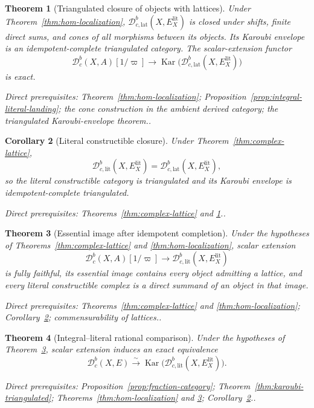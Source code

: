 \documentclass[10pt]{article}
\newtheorem{theorem}{Theorem}[section]
\newtheorem{corollary}[theorem]{Corollary}
\theoremstyle{definition}
\newcommand{\Dbc}{\mathcal D^b_c}
\newcommand{\Dbclat}{\mathcal D^b_{c,\mathrm{lat}}}
\newcommand{\Dbclit}{\mathcal D^b_{c,\mathrm{lit}}}
\newcommand{\Kar}{\operatorname{Kar}}
\newcommand{\depends}[1]{\par\smallskip\noindent\textit{Direct prerequisites:} #1.}
\begin{document}
\begin{theorem}[Triangulated closure of objects with lattices]
\label{thm:lattice-triangulated-closure}
Under Theorem~\ref{thm:hom-localization},
$\Dbclat(X,E_X^{\mathrm{lit}})$ is closed under shifts, finite direct sums,
and cones of all morphisms between its objects.  Its Karoubi envelope is an
idempotent-complete triangulated category.  The scalar-extension functor
\[
 \Dbc(X,A)[1/\varpi]\longrightarrow
 \Kar\bigl(\Dbclat(X,E_X^{\mathrm{lit}})\bigr)
\]
is exact.
\depends{Theorem~\ref{thm:hom-localization};
Proposition~\ref{prop:integral-literal-landing}; the cone construction in
the ambient derived category; the triangulated Karoubi-envelope theorem.}
\end{theorem}

\begin{corollary}[Literal constructible closure]
\label{cor:literal-constructible-closure}
Under Theorem~\ref{thm:complex-lattice},
\[
 \Dbclit(X,E_X^{\mathrm{lit}})=
 \Dbclat(X,E_X^{\mathrm{lit}}),
\]
so the literal constructible category is triangulated and its Karoubi
envelope is idempotent-complete triangulated.
\depends{Theorems~\ref{thm:complex-lattice} and
\ref{thm:lattice-triangulated-closure}.}
\end{corollary}

\begin{theorem}[Essential image after idempotent completion]
\label{thm:rational-essential-image}
Under the hypotheses of Theorems~\ref{thm:complex-lattice} and
\ref{thm:hom-localization}, scalar extension
\[
 \Dbc(X,A)[1/\varpi]\longrightarrow
 \Dbclit(X,E_X^{\mathrm{lit}})
\]
is fully faithful, its essential image contains every object admitting a
lattice, and every literal constructible complex is a direct summand of an
object in that image.
\depends{Theorems~\ref{thm:complex-lattice} and
\ref{thm:hom-localization}; Corollary~\ref{cor:literal-constructible-closure};
commensurability of lattices.}
\end{theorem}

\begin{theorem}[Integral--literal rational comparison]
\label{thm:literal-rational-comparison}
Under the hypotheses of Theorem~\ref{thm:rational-essential-image}, scalar
extension induces an exact equivalence
\[
 \Dbc(X,E)\xrightarrow{\sim}
 \Kar\bigl(\Dbclit(X,E_X^{\mathrm{lit}})\bigr).
\]
\depends{Proposition~\ref{prop:fraction-category};
Theorem~\ref{thm:karoubi-triangulated};
Theorems~\ref{thm:hom-localization} and
\ref{thm:rational-essential-image};
Corollary~\ref{cor:literal-constructible-closure}.}
\end{theorem}
\end{document}
